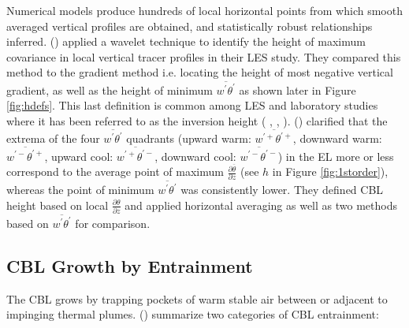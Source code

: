 Numerical models produce hundreds of local horizontal points from which smooth averaged vertical profiles are obtained, and statistically robust relationships inferred. \citeauthor{BrooksFowler2} (\citeyear{BrooksFowler2}) applied a wavelet technique to identify the height of maximum covariance in local vertical tracer profiles in their \acs{LES} study.  They compared this method to the gradient method i.e. locating the height of most negative vertical gradient, as well as the height of minimum $\overline{w^{'}\theta^{'}}$ as shown later in Figure \ref{fig:hdefs}.  This last definition is common among \acs{LES} and laboratory studies where it has been referred to as the inversion height (\citeauthor{DearWill80} \citeyear{DearWill80}, \citeauthor{Sorbjan1} \citeyear{Sorbjan1}, \citeauthor{FedConzMir04} \citeyear{FedConzMir04}).  \citeauthor{SullMoengStev} (\citeyear{SullMoengStev}) clarified that the extrema of the four $\overline{w^{'}\theta^{'}}$ quadrants (upward warm: $\overline{w^{'+}\theta^{'+}}$, downward warm: $\overline{w^{'-}\theta^{'+}}$, upward cool: $\overline{w^{'+}\theta^{'-}}$, downward cool: $\overline{w^{'-}\theta^{'-}}$) in the \acs{EL} more or less correspond to the average point of maximum $\frac{\partial \overline{\theta}}{\partial z}$ (see $h$ in Figure \ref{fig:1storder}), whereas the point of minimum $\overline{w^{'}\theta^{'}}$ was consistently lower. They defined \acs{CBL} height based on local $\frac{\partial \theta}{\partial z}$ and applied horizontal averaging as well as two methods based on $\overline{w^{'}\theta^{'}}$
for comparison.\\


\subsection{CBL Growth by Entrainment}
\label{subsec:}

The \acs{CBL} grows by trapping pockets of warm stable air between
or adjacent to impinging thermal plumes.  \citeauthor{Traum11} (\citeyear{Traum11}) summarize two categories of \acs{CBL} entrainment:\\

